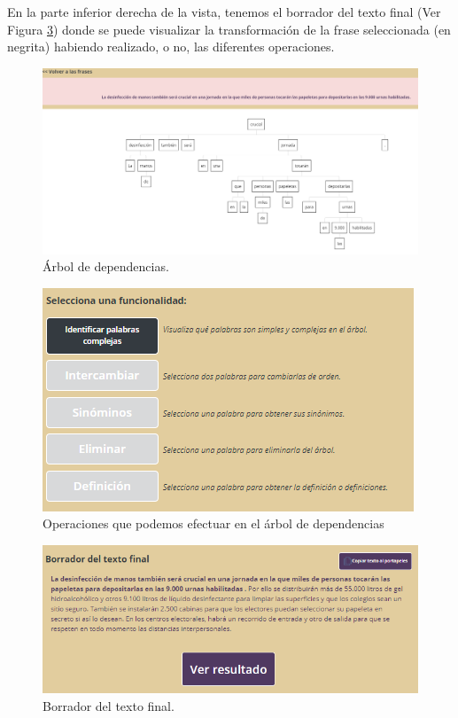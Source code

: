  En la parte inferior derecha de la vista, tenemos el borrador del texto final (Ver Figura \ref{fig:borradorTextoFinal}) donde se puede visualizar la transformación de la frase seleccionada (en negrita) habiendo realizado, o no, las diferentes operaciones. 
\begin{figure}[h!]
	\centering	
	\includegraphics[scale=0.5]{Imagenes/Figuras/arbol}	
	\caption{Árbol de dependencias.}
	\label{fig:arbolDependencias}
\end{figure}
\begin{figure}[h!]
	\centering
	\includegraphics[scale=1.0]{Imagenes/Figuras/botonesFuncionales}
	\caption{Operaciones que podemos efectuar en el árbol de dependencias}
	\label{fig:botonesFuncionales}
\end{figure}
\begin{figure}[h!]
	\centering
	\includegraphics[scale=1.0]{Imagenes/Figuras/borradorTextoFinal}
	\caption{Borrador del texto final.}
	\label{fig:borradorTextoFinal}
\end{figure}


